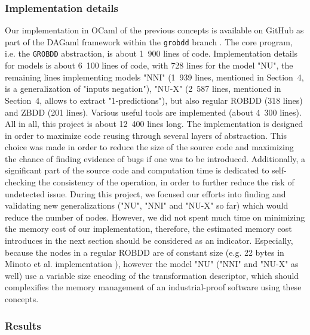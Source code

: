 \documentclass[a4paper,10pt]{article}
\newcommand{\GroBdd}{\texttt{GROBDD}}
\begin{document}
\subsubsection{Implementation details}
Our implementation in OCaml of the previous concepts is available on GitHub as part of the DAGaml framework within the \texttt{grobdd} branch \cite{DAGamlGitHub}.
The core program, i.e. the \GroBdd{} abstraction, is about 1~900 lines of code.
Implementation details for models is about 6~100 lines of code, with 728 lines for the model "NU", the remaining lines implementing models "NNI" (1~939 lines, mentioned in Section~4, is a generalization of "inputs negation"), "NU-X" (2~587 lines, mentioned in Section~4, allows to extract "1-predictions"), but also regular ROBDD (318 lines) and ZBDD (201 lines).
Various useful tools are implemented (about 4~300 lines).
All in all, this project is about 12~400 lines long.
The implementation is designed in order to maximize code reusing through several layers of abstraction.
This choice was made in order to reduce the size of the source code and maximizing the chance of finding evidence of bugs if one was to be introduced.
Additionally, a significant part of the source code and computation time is dedicated to self-checking the consistency of the operation, in order to further reduce the risk of undetected issue.
During this project, we focused our efforts into finding and validating new generalizations ("NU", "NNI" and "NU-X" so far) which would reduce the number of nodes.
However, we did not spent much time on minimizing the memory cost of our implementation, therefore, the estimated memory cost introduces in the next section should be considered as an indicator.
Especially, because the nodes in a regular ROBDD are of constant size (e.g. 22 bytes in Minoto et al. implementation \cite{MinatoVariants}), however the model "NU" ("NNI" and "NU-X" as well) use a variable size encoding of the transformation descriptor, which should complexifies the memory management of an industrial-proof software using these concepts.

\subsubsection{Results}
\end{document}
